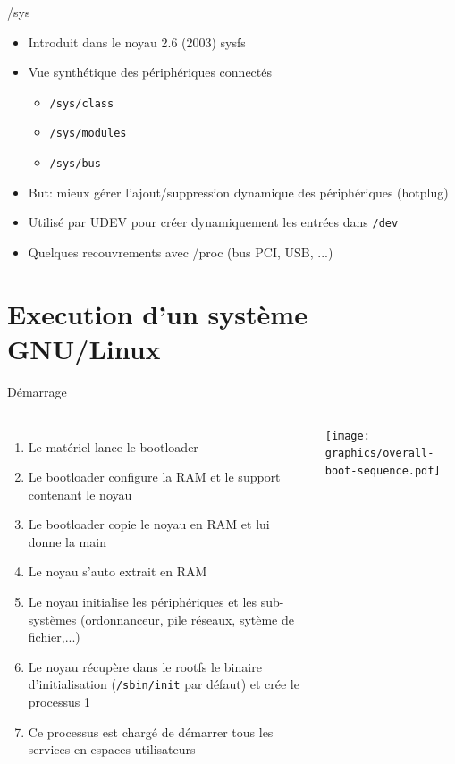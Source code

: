 \begin{frame}{/sys}
  \begin{itemize}
  \item Introduit dans le noyau 2.6 (2003) \MVRightarrow{} sysfs
  \item Vue synthétique des périphériques connectés
    \begin{itemize}
    \item \texttt{/sys/class}
    \item \texttt{/sys/modules}
    \item \texttt{/sys/bus}
    \end{itemize}
  \item But: mieux gérer l'ajout/suppression dynamique des périphériques (hotplug)
  \item Utilisé par UDEV pour créer dynamiquement les entrées dans \texttt{/dev}
  \item Quelques recouvrements avec /proc (bus PCI, USB, ...)
  \end{itemize}
\end{frame}

\section{Execution d'un système GNU/Linux}

\begin{frame}{Démarrage}
  \begin{columns}
    \begin{enumerate}
    \item Le matériel lance le bootloader
    \item Le bootloader configure la RAM et le support contenant le noyau
    \item Le bootloader copie le noyau en RAM et lui donne la main
    \item Le noyau s'auto extrait en RAM
    \item Le noyau initialise les périphériques et les sub-systèmes (ordonnanceur, pile réseaux, sytème de fichier,...)
    \item Le noyau récupère dans le rootfs le binaire d'initialisation (\texttt{/sbin/init} par défaut) et crée le processus 1
    \item Ce processus est chargé de démarrer tous les services en espaces utilisateurs
    \end{enumerate}
    \begin{center}
      \texttt{[image: graphics/overall-boot-sequence.pdf]}
    \end{center}
  \end{columns}
\end{frame}

